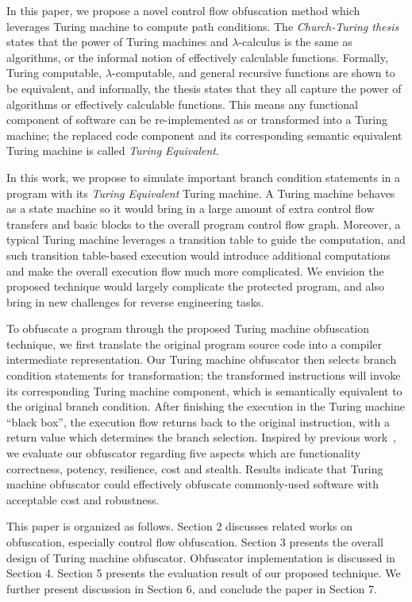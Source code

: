 \documentclass[lnicst]{svmultln}
\begin{document}
In this paper, we propose a novel control flow obfuscation method which
leverages Turing machine to compute path conditions. The \textit{Church-Turing
  thesis}~\cite{Church} states that the power of Turing machines and
$\lambda$-calculus is the same as algorithms, or the informal notion of
effectively calculable functions. Formally, Turing computable,
$\lambda$-computable, and general recursive functions are shown to be
equivalent, and informally, the thesis states that they all capture the power of
algorithms or effectively calculable functions. This means any functional
component of software can be re-implemented as or transformed into a Turing
machine; the replaced code component and its corresponding semantic equivalent
Turing machine is called \textit{Turing Equivalent}.

In this work, we propose to simulate important branch condition statements in a
program with its \textit{Turing Equivalent} Turing machine. A Turing machine
behaves as a state machine so it would bring in a large amount of extra control
flow transfers and basic blocks to the overall program control flow graph.
Moreover, a typical Turing machine leverages a transition table to guide the
computation, and such transition table-based execution would introduce
additional computations and make the overall execution flow much more
complicated. We envision the proposed technique would largely complicate the
protected program, and also bring in new challenges for reverse engineering
tasks.

To obfuscate a program through the proposed Turing machine obfuscation
technique, we first translate the original program source code into a compiler
intermediate representation. Our Turing machine obfuscator then selects branch
condition statements for transformation; the transformed instructions will invoke its
corresponding Turing machine component, which is semantically equivalent to the
original branch condition. After finishing the execution in the Turing machine
``black box'', the execution flow returns back to the original instruction, with
a return value which determines the branch selection. Inspired by previous
work~\cite{Collberg}, we evaluate our obfuscator regarding five aspects which
are functionality correctness, potency, resilience, cost and stealth. Results
indicate that Turing machine obfuscator could effectively obfuscate
commonly-used software with acceptable cost and robustness.

This paper is organized as follows. Section 2 discusses related works on
obfuscation, especially control flow obfuscation. Section 3 presents the overall
design of Turing machine obfuscator. Obfuscator implementation is discussed in
Section 4. Section 5 presents the evaluation result of our proposed technique.
We further present discussion in Section 6, and conclude the paper in Section 7.
\end{document}
